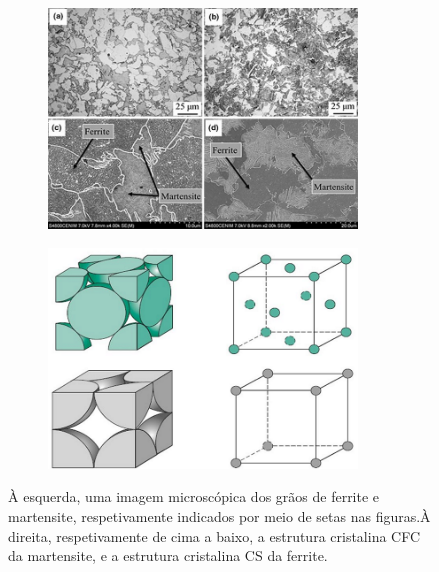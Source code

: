 \begin{figure}[htb]
    \centering
    \begin{subfigure}{.5\textwidth}
      \centering
      \includegraphics[width = 0.9\textwidth]{Figures/Cap2/Ferrite_Martensite.png}
      \caption{}
      \label{fig:Crystal}
    \end{subfigure}%
    \begin{subfigure}{.5\textwidth}
      \centering
      \includegraphics[width = 0.9\textwidth]{Figures/Cap2/CFC_CS.png}
      \caption{}
      \label{fig:CFC_CS}
    \end{subfigure}
\caption[Diferenças entre microestruturas de martensite e ferrite]%
{À esquerda, uma imagem microscópica dos grãos de ferrite e martensite, respetivamente indicados por meio de setas nas figuras.À direita, respetivamente de cima a baixo, a estrutura cristalina CFC da martensite, e a estrutura cristalina CS da ferrite.}
\end{figure}
